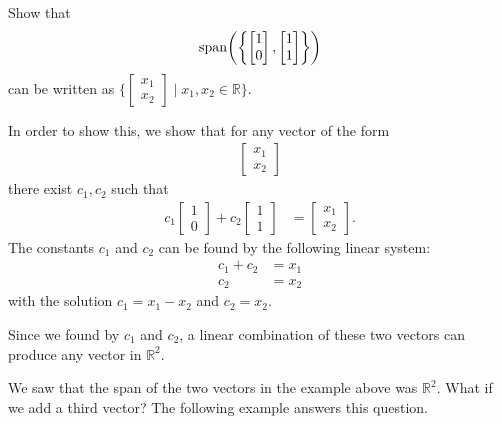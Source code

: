 \begin{example} \label{ex:span:2}


Show that
%
\begin{align*}
\operatorname{span}\biggl( \biggl\{\begin{bmatrix}
1 \\ 0
\end{bmatrix}, \begin{bmatrix}
1 \\ 1
\end{bmatrix} \biggr\} \biggr)
\end{align*}
can be written as $\{ \begin{bmatrix}
x_1 \\ x_2
\end{bmatrix} \; | \; x_1,x_2 \in \mathbb{R} \}$.

\solution

In order to show this, we show that for any vector of the form
\begin{align*}
\begin{bmatrix}
x_1 \\ x_2
\end{bmatrix}
\end{align*}  there exist $c_1, c_2$ such that
%
\begin{align*}
c_1 \begin{bmatrix}
1 \\ 0
\end{bmatrix} + c_2 \begin{bmatrix}
1 \\ 1
\end{bmatrix} & = \begin{bmatrix}
x_1 \\ x_2
\end{bmatrix}.
\end{align*}
The constants $c_1$ and $c_2$ can be found by the following linear system:
%
\begin{align*}
c_1 + c_2 & = x_1 \\
c_2 & = x_2
\end{align*}
with the solution $c_1 = x_1-x_2$ and $c_2=x_2$.

Since we found by $c_1$ and $c_2$, a linear combination of these two vectors can produce any vector in $\mathbb{R}^2$.
\end{example}

We saw that the span of the two vectors in the example above was $\mathbb{R}^2$.  What if we add a third vector?  The following example answers this question.

